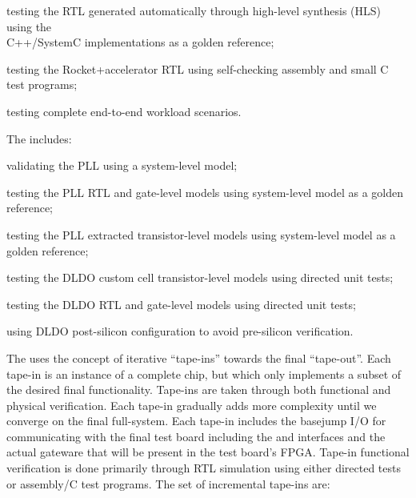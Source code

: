 \begin{cbxlist}{1.5em}{1em}{1em}
\begin{cbxlist}[--]{1.5em}{0em}{0em}
      \item testing the RTL generated automatically through high-level
         synthesis (HLS) using the \\\hspace{0.5em}C++/SystemC
         implementations as a golden reference;

      \item testing the Rocket+accelerator RTL using self-checking
         assembly and small C test programs;

      \item testing complete end-to-end workload scenarios.

    \end{cbxlist}

 \item The  includes:

    \smallskip
    \begin{cbxlist}[--]{1.5em}{0em}{0em}
      \raggedright

      \item validating the PLL using a system-level model;

      \item testing the PLL RTL and gate-level models using system-level
         model as a golden reference;

      \item testing the PLL extracted transistor-level models using
         system-level model as a golden reference;

      \item testing the DLDO custom cell transistor-level models using
         directed unit tests;

      \item testing the DLDO RTL and gate-level models using directed
         unit tests;

      \item using DLDO post-silicon configuration to avoid pre-silicon
         verification.

    \end{cbxlist}

 \item The  uses the
    concept of iterative ``tape-ins'' towards the final ``tape-out''.
    Each tape-in is an instance of a complete chip, but which only
    implements a subset of the desired final functionality. Tape-ins are
    taken through both functional and physical verification. Each tape-in
    gradually adds more complexity until we converge on the final
    full-system. Each tape-in includes the basejump I/O for communicating
    with the final test board including the  and
     interfaces and the actual gateware that will be present
    in the test board's FPGA. Tape-in functional verification is done
    primarily through RTL simulation using either directed tests or
    assembly/C test programs. The set of incremental tape-ins are:


\end{cbxlist}
